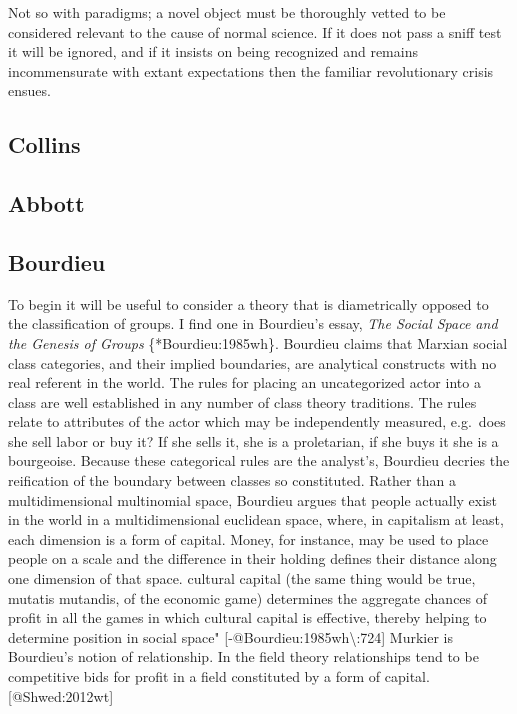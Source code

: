\documentclass [PhD] {uclathes}
\begin{document}
Not so with paradigms; a novel object must be thoroughly vetted to be
considered relevant to the cause of normal science. If it does not pass
a sniff test it will be ignored, and if it insists on being recognized
and remains incommensurate with extant expectations then the familiar
revolutionary crisis ensues.

\subsection{Collins}\label{collins}

\subsection{Abbott}\label{abbott}

\subsection{Bourdieu}\label{bourdieu}

To begin it will be useful to consider a theory that is diametrically
opposed to the classification of groups. I find one in Bourdieu's essay,
\emph{The Social Space and the Genesis of Groups} \{*Bourdieu:1985wh\}.
Bourdieu claims that Marxian social class categories, and their implied
boundaries, are analytical constructs with no real referent in the
world. The rules for placing an uncategorized actor into a class are
well established in any number of class theory traditions. The rules
relate to attributes of the actor which may be independently measured,
e.g.~does she sell labor or buy it? If she sells it, she is a
proletarian, if she buys it she is a bourgeoise. Because these
categorical rules are the analyst's, Bourdieu decries the reification of
the boundary between classes so constituted. Rather than a
multidimensional multinomial space, Bourdieu argues that people actually
exist in the world in a multidimensional euclidean space, where, in
capitalism at least, each dimension is a form of capital. Money, for
instance, may be used to place people on a scale and the difference in
their holding defines their distance along one dimension of that space.
cultural capital (the same thing would be true, mutatis mutandis, of the
economic game) determines the aggregate chances of profit in all the
games in which cultural capital is effective, thereby helping to
determine position in social space"
{[}-@Bourdieu:1985wh\textbackslash{}:724{]} Murkier is Bourdieu's notion
of relationship. In the field theory relationships tend to be
competitive bids for profit in a field constituted by a form of capital.
{[}@Shwed:2012wt{]}
\end{document}
